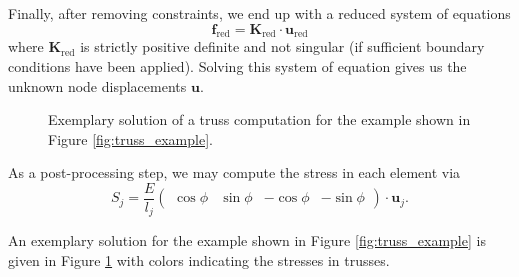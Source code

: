 Finally, after removing constraints, we end up with a reduced system of equations 
\begin{equation}
     \mathbf{f}_\textrm{red} = \mathbf{K}_\textrm{red}  \cdot \mathbf{u}_\textrm{red} 
     \label{eq:reduced_system}
\end{equation}
where $\mathbf{K}_\textrm{red}$ is strictly positive definite and not singular (if sufficient boundary conditions have been applied). Solving this system of equation gives us the unknown node displacements $\mathbf{u}$. 

\begin{figure}[!htpb]
    \centering
    
    \caption{Exemplary solution of a truss computation for the example shown in Figure \ref{fig:truss_example}.}
    \label{fig:truss_example_solved}
\end{figure}

As a post-processing step, we may compute the stress in each element via
\begin{equation}
    S_j = \frac{E}{l_j} 
    \begin{pmatrix}
        \cos{\phi} & \sin{\phi} & -\cos{\phi} & -\sin{\phi}
    \end{pmatrix}
    \cdot 
    \mathbf{u}_j.
\end{equation}

An exemplary solution for the example shown in Figure \ref{fig:truss_example} is given in Figure \ref{fig:truss_example_solved} with colors indicating the stresses in trusses.

